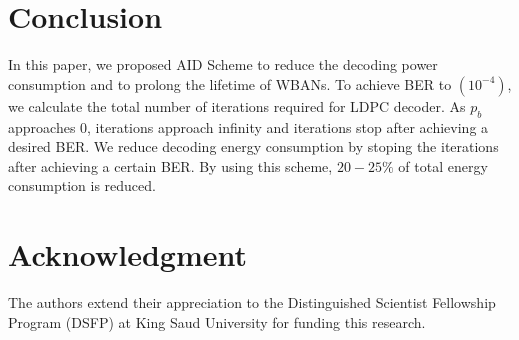 \documentclass[3p,times,procedia]{elsarticle}
\begin{document}
\vspace{-0.4cm}
\section{Conclusion}
\label{sec:majhead}
\vspace{-0.3cm}
In this paper, we proposed AID Scheme to reduce the decoding power consumption and to prolong the lifetime of WBANs. To achieve BER to $(10^{-4})$, we calculate the total number of iterations required for LDPC decoder. As $p_b$ approaches $0$, iterations approach infinity and iterations stop after achieving a desired BER. We reduce decoding energy consumption by stoping the iterations after achieving a certain BER. By using this scheme, $20-25\%$ of total energy consumption is reduced.

\vspace{-0.4cm}
\section{Acknowledgment}
\vspace{-0.3cm}
The authors extend their appreciation to the Distinguished Scientist Fellowship Program (DSFP) at King Saud University
for funding this research.
\end{document}
